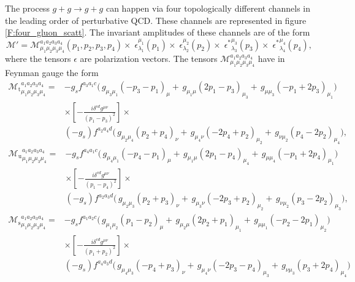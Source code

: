\documentclass[a4paper, twoside, english, 12pt]{article}
\begin{document}
The process $g+g\rightarrow g+g$ can happen via four topologically different channels in the leading order of perturbative QCD. These channels are represented in figure \ref{F:four_gluon_scatt}. The invariant amplitudes of these channels are of the form
\begin{equation}
\mathcal{M}'=\mathcal{M}_{\mu_1\mu_2\mu_3\mu_4}^{a_1a_2a_3a_4}(p_1,p_2,p_3,p_4)\times\; \epsilon_{\lambda_1}^{\mu_1}(p_1)\times\; \epsilon_{\lambda_2}^{\mu_2}(p_2)\times\; {\epsilon^*}_{\lambda_3}^{\mu_3}(p_3)\times\; {\epsilon^*}_{\lambda_4}^{\mu_4}(p_4),
\end{equation}
where the tensors $\epsilon$ are polarization vectors. The tensors $\mathcal{M}_{\mu_1\mu_2\mu_3\mu_4}^{a_1a_2a_3a_4}$ have in Feynman gauge the form
\begin{align*}
{\mathcal{M}_\text{t}}_{\mu_1\mu_2\mu_3\mu_4}^{a_1a_2a_3a_4} = &-g_sf^{a_3a_1c}\Big(\,g_{\mu_3\mu_1}(-{p_3}-{p_1})_{\mu} + \,g_{\mu_1\mu}(2{p_1}-{p_3})_{\mu_3} + \,g_{\mu\mu_3}(-{p_1}+2{p_3})_{\mu_1}\Big) \\
&\times \left[-\frac{i\delta^{cd}g^{\mu\nu}}{(p_1-p_3)^2}\right] \times\\
&(-g_s)f^{a_2a_4d}\Big(\,g_{\mu_2\mu_4}({p_2}+{p_4})_{\nu} + \,g_{\mu_4\nu}(-2{p_4}+{p_2})_{\mu_2} + \,g_{\nu\mu_2}({p_4}-2{p_2})_{\mu_4}\Big),
\end{align*}
\begin{align*}
{\mathcal{M}_\text{u}}_{\mu_1\mu_2\mu_3\mu_4}^{a_1a_2a_3a_4} = &-g_sf^{a_4a_1c}\Big(\,g_{\mu_4\mu_1}(-{p_4}-{p_1})_{\mu} + \,g_{\mu_1\mu}(2{p_1}-{p_4})_{\mu_4} + \,g_{\mu\mu_4}(-{p_1}+2{p_4})_{\mu_1}\Big) \\
&\times \left[-\frac{i\delta^{cd}g^{\mu\nu}}{(p_1-p_4)^2}\right] \times\\
&(-g_s)f^{a_2a_3d}\Big(\,g_{\mu_2\mu_3}({p_2}+{p_3})_{\nu} + \,g_{\mu_3\nu}(-2{p_3}+{p_2})_{\mu_2} + \,g_{\nu\mu_2}({p_3}-2{p_2})_{\mu_3}\Big),
\end{align*}
\begin{align*}
{\mathcal{M}_\text{s}}_{\mu_1\mu_2\mu_3\mu_4}^{a_1a_2a_3a_4} = &-g_sf^{a_1a_2c}\Big(\,g_{\mu_1\mu_2}({p_1}-{p_2})_{\mu} + \,g_{\mu_2\mu}(2{p_2}+{p_1})_{\mu_1} + \,g_{\mu\mu_1}(-{p_2}-2{p_1})_{\mu_2}\Big) \\
&\times \left[-\frac{i\delta^{cd}g^{\mu\nu}}{(p_1+p_2)^2}\right] \times\\
&(-g_s)f^{a_4a_3d}\Big(\,g_{\mu_4\mu_3}(-{p_4}+{p_3})_{\nu} + \,g_{\mu_4\nu}(-2{p_3}-{p_4})_{\mu_3} + \,g_{\nu\mu_3}({p_3}+2{p_4})_{\mu_4}\Big)
\end{align*}
\end{document}
